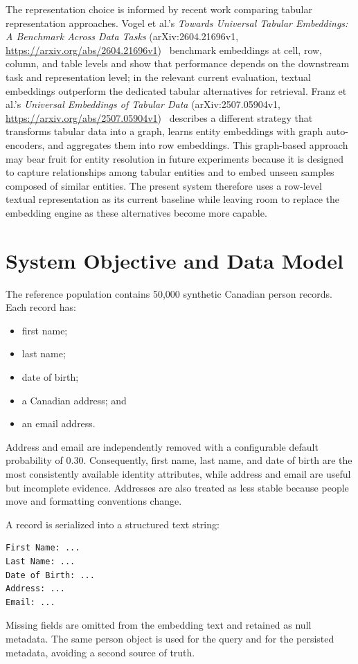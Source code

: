 \documentclass[conference]{IEEEtran}
\begin{document}
The representation choice is informed by recent work comparing tabular representation approaches. Vogel et al.'s \emph{Towards Universal Tabular Embeddings: A Benchmark Across Data Tasks} (arXiv:2604.21696v1, \url{https://arxiv.org/abs/2604.21696v1})~\cite{vogel2026} benchmark embeddings at cell, row, column, and table levels and show that performance depends on the downstream task and representation level; in the relevant current evaluation, textual embeddings outperform the dedicated tabular alternatives for retrieval. Franz et al.'s \emph{Universal Embeddings of Tabular Data} (arXiv:2507.05904v1, \url{https://arxiv.org/abs/2507.05904v1})~\cite{franz2025} describes a different strategy that transforms tabular data into a graph, learns entity embeddings with graph auto-encoders, and aggregates them into row embeddings. This graph-based approach may bear fruit for entity resolution in future experiments because it is designed to capture relationships among tabular entities and to embed unseen samples composed of similar entities. The present system therefore uses a row-level textual representation as its current baseline while leaving room to replace the embedding engine as these alternatives become more capable.

\section{System Objective and Data Model}
The reference population contains 50,000 synthetic Canadian person records. Each record has:
\begin{itemize}[leftmargin=*]
  \item first name;
  \item last name;
  \item date of birth;
  \item a Canadian address; and
  \item an email address.
\end{itemize}

Address and email are independently removed with a configurable default probability of 0.30. Consequently, first name, last name, and date of birth are the most consistently available identity attributes, while address and email are useful but incomplete evidence. Addresses are also treated as less stable because people move and formatting conventions change.

A record is serialized into a structured text string:
\begin{lstlisting}
First Name: ...
Last Name: ...
Date of Birth: ...
Address: ...
Email: ...
\end{lstlisting}
Missing fields are omitted from the embedding text and retained as null metadata. The same person object is used for the query and for the persisted metadata, avoiding a second source of truth.
\end{document}
